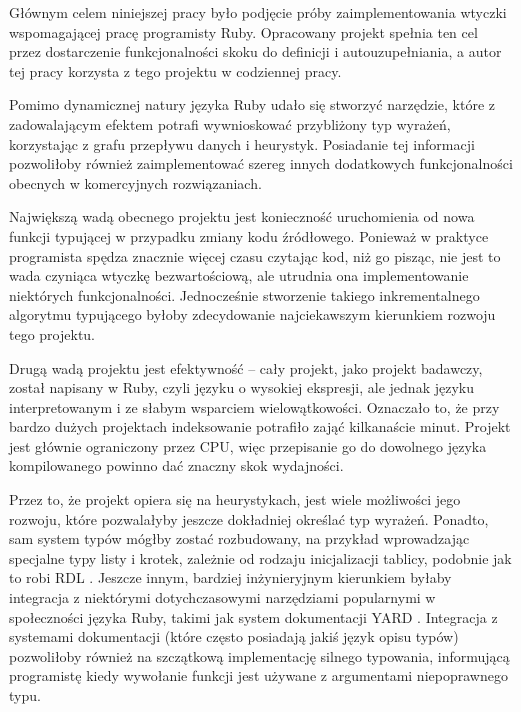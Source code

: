\documentclass[declaration,shortabstract,mgr]{iithesis}
\begin{document}
Głównym celem niniejszej pracy było podjęcie próby zaimplementowania wtyczki wspomagającej pracę programisty Ruby. Opracowany projekt spełnia ten cel przez dostarczenie funkcjonalności skoku do definicji i autouzupełniania, a autor tej pracy korzysta z tego projektu w codziennej pracy.

Pomimo dynamicznej natury języka Ruby udało się stworzyć narzędzie, które z zadowalającym efektem potrafi wywnioskować przybliżony typ wyrażeń, korzystając z grafu przepływu danych i heurystyk. Posiadanie tej informacji pozwoliłoby również zaimplementować szereg innych dodatkowych funkcjonalności obecnych w komercyjnych rozwiązaniach.

Największą wadą obecnego projektu jest konieczność uruchomienia od nowa funkcji typującej w przypadku zmiany kodu źródłowego. Ponieważ w praktyce programista spędza znacznie więcej czasu czytając kod, niż go pisząc, nie jest to wada czyniąca wtyczkę bezwartościową, ale utrudnia ona implementowanie niektórych funkcjonalności. Jednocześnie stworzenie takiego inkrementalnego algorytmu typującego byłoby zdecydowanie najciekawszym kierunkiem rozwoju tego projektu.

Drugą wadą projektu jest efektywność -- cały projekt, jako projekt badawczy, został napisany w Ruby, czyli języku o wysokiej ekspresji, ale jednak języku interpretowanym i ze słabym wsparciem wielowątkowości. Oznaczało to, że przy bardzo dużych projektach indeksowanie potrafiło zająć kilkanaście minut. Projekt jest głównie ograniczony przez CPU, więc przepisanie go do dowolnego języka kompilowanego powinno dać znaczny skok wydajności.

Przez to, że projekt opiera się na heurystykach, jest wiele możliwości jego rozwoju, które pozwalałyby jeszcze dokładniej określać typ wyrażeń. Ponadto, sam system typów mógłby zostać rozbudowany, na przykład wprowadzając specjalne typy listy i krotek, zależnie od rodzaju inicjalizacji tablicy, podobnie jak to robi RDL \cite{RDL}. Jeszcze innym, bardziej inżynieryjnym kierunkiem byłaby integracja z niektórymi dotychczasowymi narzędziami popularnymi w społeczności języka Ruby, takimi jak system dokumentacji YARD \cite{YARD}. Integracja z systemami dokumentacji (które często posiadają jakiś język opisu typów) pozwoliłoby również na szczątkową implementację silnego typowania, informującą programistę kiedy wywołanie funkcji jest używane z argumentami niepoprawnego typu.


\printbibliography
\end{document}

